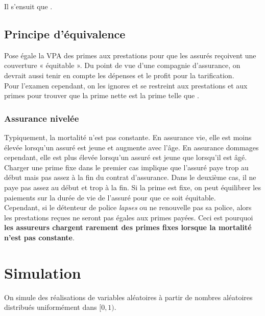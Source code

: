 \documentclass[10pt, french]{article}
\begin{document}
\begin{multicols*}{2}
Il s'ensuit que .


\columnbreak
\subsection{Principe d'équivalence}
\begin{definitionNOHFILL}
Pose égale la VPA des primes aux prestations pour que les assurés reçoivent une couverture « équitable ». Du point de vue d'une compagnie d'assurance, on devrait aussi tenir en compte les dépenses et le profit pour la tarification. \\

Pour l'examen cependant, on les ignores et se restreint aux prestations et aux primes pour trouver que la prime nette est la prime telle que .
\end{definitionNOHFILL}



\subsubsection{Assurance nivelée}
\begin{rappel_enhanced}[Contexte]
Typiquement, la mortalité n'est pas constante. En assurance vie, elle est moins élevée lorsqu'un assuré est jeune et augmente avec l'âge. En assurance dommages cependant, elle est plus élevée lorsqu'un assuré est jeune que lorsqu'il est âgé.	\\

Charger une prime fixe dans le premier cas implique que l'assuré paye trop au début mais pas assez à la fin du contrat d'assurance. Dans le deuxième cas, il ne paye pas assez au début et trop à la fin. Si la prime est fixe, on peut équilibrer les paiements sur la durée de vie de l'assuré pour que ce soit équitable.	\\

Cependant, si le détenteur de police \og \textit{lapses} \fg{} ou ne renouvelle pas sa police, alors les prestations reçues ne seront pas égales aux primes payées. Ceci est pourquoi \textbf{les assureurs chargent rarement des primes fixes lorsque la mortalité n'est pas constante}.
\end{rappel_enhanced}





\newpage	
\section{Simulation}
On simule des réalisations de variables aléatoires à partir de nombres aléatoires distribués uniformément dans $[0, 1)$.


\end{multicols*}
\end{document}
